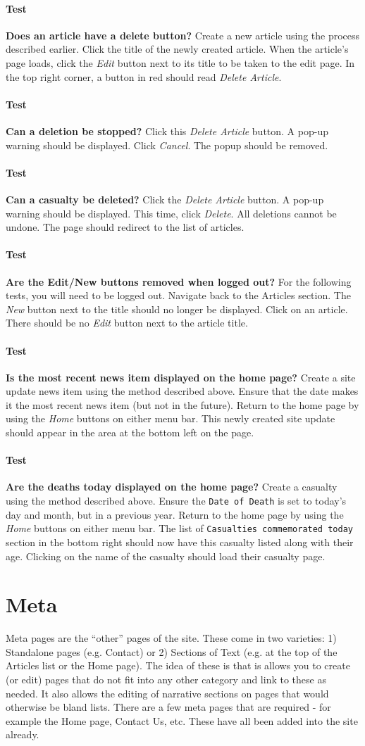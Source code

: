 \documentclass[12pt]{article}
\newcounter{Test}
\newcommand{\test}[1]{%
\stepcounter{Test}%
\paragraph{Test \theTest} \textbf{#1} }
\begin{document}
\test{Does an article have a delete button?}
Create a new article using the process described earlier. Click the title of the newly created article. When the article's page loads, click the \textit{Edit} button next to its title to be taken to the edit page. In the top right corner, a button in red should read \textit{Delete Article}.

\test{Can a deletion be stopped?}
Click this \textit{Delete Article} button. A pop-up warning should be displayed. Click \textit{Cancel}. The popup should be removed.

\test{Can a casualty be deleted?}
Click the \textit{Delete Article} button. A pop-up warning should be displayed. This time, click \textit{Delete}. All deletions cannot be undone. The page should redirect to the list of articles.

\test{Are the Edit/New buttons removed when logged out?}
For the following tests, you will need to be logged out. Navigate back to the Articles section. The \textit{New} button next to the title should no longer be displayed. Click on an article. There should be no \textit{Edit} button next to the article title.

\test{Is the most recent news item displayed on the home page?}
Create a site update news item using the method described above. Ensure that the date makes it the most recent news item (but not in the future). Return to the home page by using the \textit{Home} buttons on either menu bar. This newly created site update should appear in the area at the bottom left on the page.

\test{Are the deaths today displayed on the home page?}
Create a casualty using the method described above. Ensure the \texttt{Date of Death} is set to today's day and month, but in a previous year. Return to the home page by using the \textit{Home} buttons on either menu bar. The list of \texttt{Casualties commemorated today} section in the bottom right should now have this casualty listed along with their age. Clicking on the name of the casualty should load their casualty page.

\section{Meta}\label{sec:meta}
Meta pages are the ``other'' pages of the site. These come in two varieties: 1) Standalone pages (e.g. Contact) or 2) Sections of Text (e.g. at the top of the Articles list or the Home page). The idea of these is that is allows you to create (or edit) pages that do not fit into any other category and link to these as needed. It also allows the editing of narrative sections on pages that would otherwise be bland lists. There are a few meta pages that are required - for example the Home page, Contact Us, etc. These have all been added into the site already.
\end{document}
